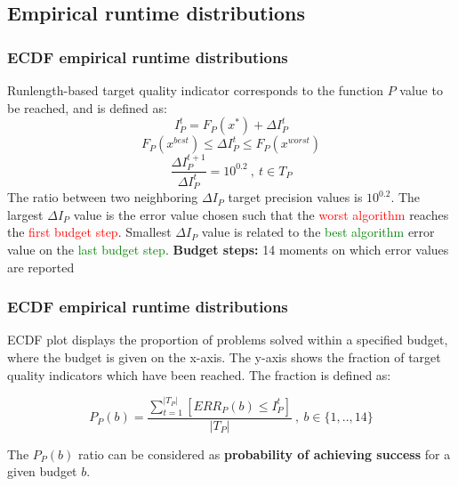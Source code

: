 \documentclass[hyperref={pdfpagelabels=false}]{beamer}
\begin{document}
\subsection{Empirical runtime distributions}
\begin{frame}
\frametitle{ECDF empirical runtime distributions} 

Runlength-based target quality indicator corresponds to the function $P$ value to be reached, and is defined as:
\begin{equation*}
 I_P^{t} = F_P({x^*}) + \Delta I_P^{t}
\end{equation*}
\begin{equation*}
F_P(x^{best}) \leq  \Delta I_P^{t} \leq F_P(x^{worst})
\end{equation*}
\begin{equation*}
\frac{\Delta I_P^{t+1}}{\Delta I_P^{t}} = 10^{0.2} \ , \ t \in T_P 
\end{equation*}
The ratio between two neighboring $\Delta I_P$ target precision values is $10^{0.2}$. The largest $\Delta I_P$ value is the error value chosen such that the \textcolor{red}{worst algorithm} reaches the \textcolor{red}{first budget step}. Smallest $\Delta I_P$ value is related to the \textcolor{green}{best algorithm} error value on the \textcolor{green}{last budget step}.
\newline 
\newline
\textbf{Budget steps:} 14 moments on which error values are reported

%

\end{frame}

\begin{frame}
\frametitle{ECDF empirical runtime distributions} 

ECDF plot displays the proportion of problems solved within a specified budget, where the budget is given on the x-axis. The y-axis shows the fraction of target quality indicators which have been reached. The fraction is defined as:

\begin{equation*}
  P_P(b) = \frac{\sum_{t=1}^{|T_P|}[ ERR_P(b) \leq I_P^t]}{|T_P|} \ , \ b \in \{1,..,14\}
\end{equation*}

The $P_P(b)$ ratio can be considered as \textbf{probability of achieving success} for a given budget $b$.

\end{frame}
\end{document}
